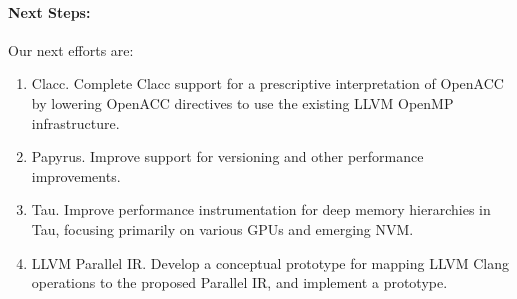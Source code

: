 \paragraph{Next Steps:}

Our next efforts are:

\begin{enumerate}
	\item Clacc. Complete Clacc support for a prescriptive interpretation of OpenACC by lowering OpenACC directives to use the existing LLVM OpenMP infrastructure.
    
	\item Papyrus. Improve support for versioning and other performance improvements.
    
    \item Tau. Improve performance instrumentation for deep memory hierarchies in Tau, focusing primarily on various GPUs and emerging NVM.
    
    \item LLVM Parallel IR. Develop a conceptual prototype for mapping LLVM Clang operations to the proposed Parallel IR, and implement a prototype.

\end{enumerate}
